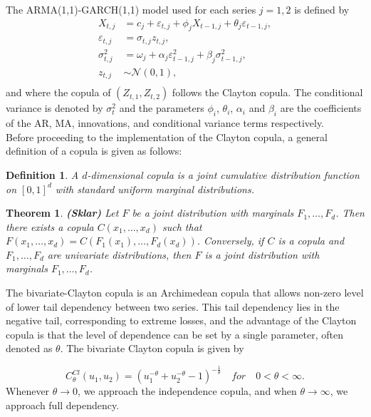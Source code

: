 \documentclass[a4paper,12pt]{article}
\theoremstyle{plain}
\newtheorem{thm}{Theorem}
\newtheorem{mydef}{Definition}
\begin{document}
The ARMA(1,1)-GARCH(1,1) model used for each series $j=1,2$ is defined by
\begin{equation}
    \begin{split}
        X_{t,j} &= c_j + \varepsilon_{t,j} + \phi_jX_{t-1,j} + \theta_j\varepsilon_{t-1,j},\\
        \varepsilon_{t,j} &= \sigma_{t,j}z_{t,j}, \\
        \sigma^2_{t,j} &= \omega_j + \alpha_j\varepsilon_{t-1,j}^2 + \beta_j\sigma_{t-1,j}^2, \\
        z_{t,j} &\sim \mathcal{N}\left(0, 1\right),\\
    \end{split}
    \label{eq:armagarchdef}
\end{equation}
and where the copula of $\left(Z_{t,1},Z_{t,2}\right)$ follows the Clayton copula. The conditional variance is denoted by $\sigma^2_t$ and the parameters $\phi_i$, $\theta_i$, $\alpha_i$ and $\beta_i$ are the coefficients of the AR, MA, innovations, and conditional variance terms respectively.\\

Before proceeding to the implementation of the Clayton copula, a general definition of a copula is given as follows: 


\begin{mydef}
A $d$-dimensional copula is a joint cumulative distribution function on $\left[0, 1\right]^d$ with standard uniform marginal distributions.
\end{mydef}

\begin{thm}{\textbf{(Sklar)}}
    Let $F$ be a joint distribution with marginals $F_1,\dots,F_d$. Then there exists a copula $C(x_1,\dots,x_d)$ such that $F(x_1,\dots,x_d)=C(F_1(x_1),\dots,F_d(x_d))$. Conversely, if $C$ is a copula and $F_1,\dots,F_d$ are univariate distributions, then $F$ is a joint distribution with marginals $F_1,\dots,F_d$.
\end{thm}

The bivariate-Clayton copula is an Archimedean copula that allows non-zero level of lower tail dependency between two series. This tail dependency lies in the negative tail, corresponding to extreme losses, and the advantage of the Clayton copula is that the level of dependence can be set by a single parameter, often denoted as $\theta$. The bivariate Clayton copula is given by

\begin{equation}
    C_\theta^{Cl}\left(u_1,u_2\right) = \left(u_1^{-\theta} + u_2^{-\theta} - 1\right)^{-\frac{1}{\theta}} \quad for \quad 0<\theta<\infty.
\end{equation}
Whenever $\theta \to 0$, we approach the independence copula, and when $\theta \to \infty$, we approach full dependency.\\
\end{document}
